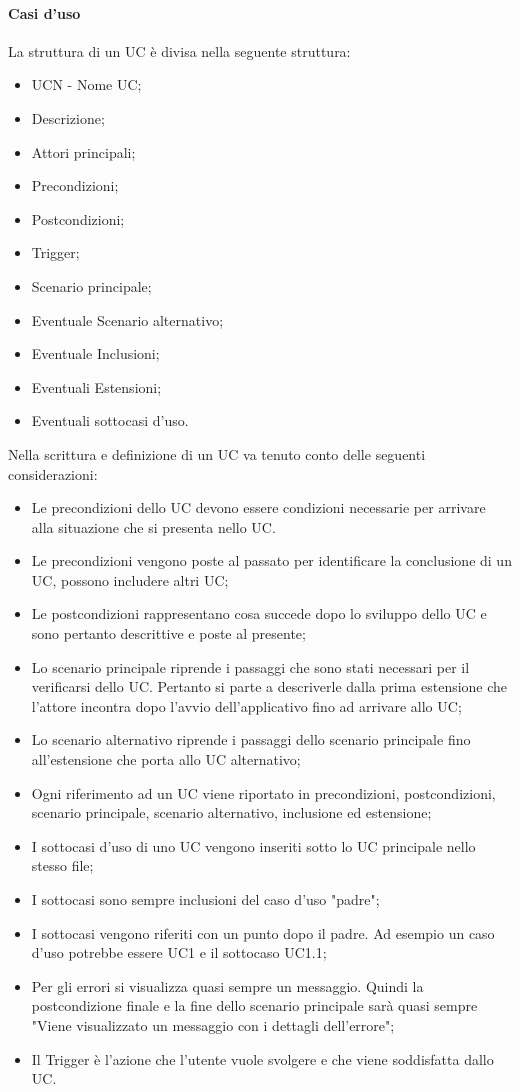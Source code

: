 \paragraph{Casi d'uso}
La struttura di un UC è divisa nella seguente struttura:
\begin{itemize}
  \item UCN - Nome UC;
  \item Descrizione;
  \item Attori principali;
  \item Precondizioni;
  \item Postcondizioni;
  \item Trigger;
  \item Scenario principale;
  \item Eventuale Scenario alternativo;
  \item Eventuale Inclusioni;
  \item Eventuali Estensioni;
  \item Eventuali sottocasi d'uso.
\end{itemize}
Nella scrittura e definizione di un UC va tenuto conto delle seguenti considerazioni:
\begin{itemize}
  \item Le precondizioni dello UC devono essere condizioni necessarie per arrivare alla situazione che si presenta nello UC.
  \item Le precondizioni vengono poste al passato per identificare la conclusione di un UC, possono includere altri UC;
  \item Le postcondizioni rappresentano cosa succede dopo lo sviluppo dello UC e sono pertanto descrittive e poste al presente;
  \item Lo scenario principale riprende i passaggi che sono stati necessari per il verificarsi dello UC. Pertanto si parte a descriverle dalla prima estensione che l'attore incontra dopo l'avvio dell'applicativo fino ad arrivare allo UC;
  \item Lo scenario alternativo riprende i passaggi dello scenario principale fino all'estensione che porta allo UC alternativo;
  \item Ogni riferimento ad un UC viene riportato in precondizioni, postcondizioni, scenario principale, scenario alternativo, inclusione ed estensione;
  \item I sottocasi d'uso di uno UC vengono inseriti sotto lo UC principale nello stesso file;
  \item I sottocasi sono sempre inclusioni del caso d'uso "padre";
  \item I sottocasi vengono riferiti con un punto dopo il padre. Ad esempio un caso d'uso potrebbe essere UC1 e il sottocaso UC1.1;
  \item Per gli errori si visualizza quasi sempre un messaggio. Quindi la postcondizione finale e la fine dello scenario principale sarà quasi sempre "Viene visualizzato un messaggio con i dettagli dell'errore";
  \item Il Trigger è l'azione che l'utente vuole svolgere e che viene soddisfatta dallo UC.
\end{itemize}

